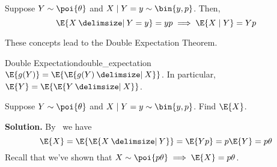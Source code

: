 \begin{Example}{}{}
    Suppose $ Y \sim \poi{\theta} $ and $ X\mid Y=y \sim \bin{y,p} $. Then,
    \[ \E{X\given Y=y}=yp\implies \E{X\mid Y}=Yp \]
\end{Example}
These concepts lead to the Double Expectation Theorem.
\begin{Theorem}{Double Expectation}{double_expectation}
    $ \E{g(Y)}=\E{\E{g(Y)\given X}} $.
    In particular, $ \E{Y}=\E{\E{Y\given X}} $.
\end{Theorem}
\begin{Example}{}{}
    Suppose $ Y \sim \poi{\theta} $ and $ X\mid Y=y \sim \bin{y,p} $. Find $ \E{X} $.

    \textbf{Solution.} By~ we have
    \[ \E{X}=\E{\E{X\given Y}}=\E{Yp}=p\E{Y}=p\theta \]
    Recall that we've shown that $ X \sim \poi{p\theta}\implies \E{X}=p\theta $.
\end{Example}
